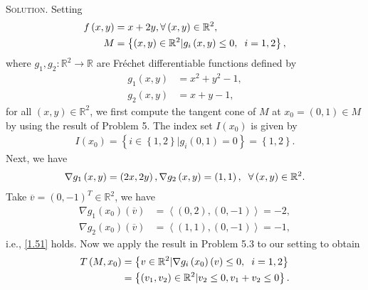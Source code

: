 \documentclass[a4paper]{article}
\numberwithin{equation}{section}
\begin{document}
\\
\textsc{Solution.} Setting
\begin{align}
f\left( {x,y} \right) &= x + 2y,\forall \left( {x,y} \right) \in {\mathbb{R}^2},\\
M  &= \left\{ {\left( {x,y} \right) \in {\mathbb{R}^2}|{g_i}\left( {x,y} \right) \le 0,\hspace{0.2cm} i = 1,2} \right\},
\end{align}
where $g_1,g_2:\mathbb{R}^2\to \mathbb{R}$ are Fr\'{e}chet differentiable functions defined by
\begin{align}
{g_1}\left( {x,y} \right) &= {x^2} + {y^2} - 1,\\
{g_2}\left( {x,y} \right) &= x + y - 1,
\end{align}
for all $\left(x,y\right) \in \mathbb{R}^2$, we first compute the tangent cone of $M$ at $x_0=\left(0,1\right)\in M$ by using the result of Problem 5. The index set $I\left(x_0\right)$ is given by
\begin{align}
I\left( {{x_0}} \right) = \left\{ {i \in \left\{ {1,2} \right\}|{g_i}\left( {0,1} \right) = 0} \right\} = \left\{ {1,2} \right\}.
\end{align}
Next, we have
\begin{align}
\nabla {g_1}\left( {x,y} \right) = \left( {2x,2y} \right),\nabla {g_2}\left( {x,y} \right) = \left( {1,1} \right),\hspace{0.2cm}\forall \left( {x,y} \right) \in {\mathbb{R}^2}.
\end{align}
Take $\overline v=\left(0,-1\right)^T \in \mathbb{R}^2$, we have
\begin{align}
\nabla {g_1}\left( {{x_0}} \right)\left( {\overline v } \right) &= \left\langle {\left( {0,2} \right),\left( {0, - 1} \right)} \right\rangle  =  - 2,\\
\nabla {g_2}\left( {{x_0}} \right)\left( {\overline v } \right) &= \left\langle {\left( {1,1} \right),\left( {0, - 1} \right)} \right\rangle  =  - 1,
\end{align}
i.e., \eqref{1.51} holds. Now we apply the result in Problem 5.3 to our setting to obtain
\begin{align}
T\left( {M,{x_0}} \right) &= \left\{ {v \in {\mathbb{R}^2}|\nabla {g_i}\left( {{x_0}} \right)\left( v \right) \le 0,\hspace{0.2cm} i = 1,2} \right\}\\
 &= \left\{ {\left( {{v_1},{v_2}} \right) \in {\mathbb{R}^2}|{v_2} \le 0,{v_1} + {v_2} \le 0} \right\}.
\end{align}
\end{document}
